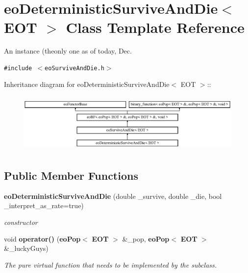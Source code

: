 \section{eo\-Deterministic\-Survive\-And\-Die$<$ EOT $>$ Class Template Reference}
\label{classeo_deterministic_survive_and_die}
An instance (theonly one as of today, Dec.  


{\tt \#include $<$eo\-Survive\-And\-Die.h$>$}

Inheritance diagram for eo\-Deterministic\-Survive\-And\-Die$<$ EOT $>$::\begin{figure}[H]
\begin{center}
\leavevmode
\includegraphics[height=3.01075cm]{classeo_deterministic_survive_and_die}
\end{center}
\end{figure}
\subsection*{Public Member Functions}
\begin{CompactItemize}
\item 
{\bf eo\-Deterministic\-Survive\-And\-Die} (double \_\-survive, double \_\-die, bool \_\-interpret\_\-as\_\-rate=true)\label{classeo_deterministic_survive_and_die_a0}

\begin{CompactList}\small\item\em constructor \item\end{CompactList}\item 
void {\bf operator()} ({\bf eo\-Pop}$<$ {\bf EOT} $>$ \&\_\-pop, {\bf eo\-Pop}$<$ {\bf EOT} $>$ \&\_\-lucky\-Guys)\label{classeo_deterministic_survive_and_die_a1}

\begin{CompactList}\small\item\em The pure virtual function that needs to be implemented by the subclass. \item\end{CompactList}\end{CompactItemize}


